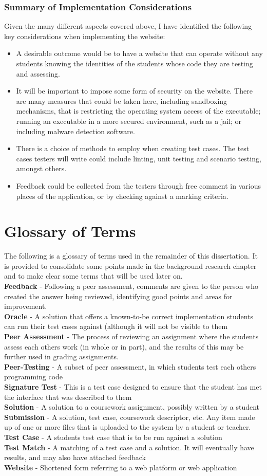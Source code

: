 \documentclass[a4paper,11pt]{report}
\newcommand{\gloss}[2]{\\\textbf{#1} - {#2}}
\begin{document}
\subsection{Summary of Implementation Considerations}
Given the many different aspects covered above, I have identified the following key considerations when implementing the website:
\begin{itemize}
 \item A desirable outcome would be to have a website that can operate without any students knowing the identities of the students whose code they are testing and assessing.
 \item It will be important to impose some form of security on the website. There are many measures that could be taken here, including sandboxing mechanisms, that is restricting the operating system access of the executable; running an executable in a more secured environment, such as a jail; or including malware detection software.
 \item There is a choice of methods to employ when creating test cases. The test cases testers will write could include linting, unit testing and scenario testing, amongst others.
 \item Feedback could be collected from the testers through free comment in various places of the application, or by checking against a marking criteria.
\end{itemize}


\chapter{Glossary of Terms}
The following is a glossary of terms used in the remainder of this dissertation. It is provided to consolidate some points made in the background research chapter and to make clear some terms that will be used later on.
\gloss{Feedback}{Following a peer assessment, comments are given to the person who created the answer being reviewed, identifying good points and areas for improvement.}
\gloss{Oracle}{A solution that offers a known-to-be correct implementation students can run their test cases against (although it will not be visible to them}
\gloss{Peer Assessment}{The process of reviewing an assignment where the students assess each others work (in whole or in part), and the results of this may be further used in grading assignments.}
\gloss{Peer-Testing}{A subset of peer assessment, in which students test each others programming code}
\gloss{Signature Test}{This is a test case designed to ensure that the student has met the interface that was described to them}
\gloss{Solution}{A solution to a coursework assignment, possibly written by a student}
\gloss{Submission}{A solution, test case, coursework descriptor, etc. Any item made up of one or more files that is uploaded to the system by a student or teacher.}
\gloss{Test Case}{A students test case that is to be run against a solution}
\gloss{Test Match}{A matching of a test case and a solution. It will eventually have results, and may also have attached feedback}
\gloss{Website}{Shortened form referring to a web platform or web application}
\end{document}
